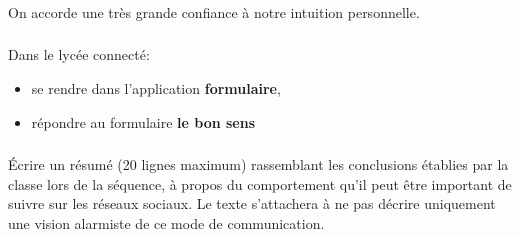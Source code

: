 \documentclass[svgnames,11pt]{beamer}
\begin{document}
\begin{frame}
    \frametitle{}

    \begin{aretenir}[Biais 4]
    \centering On accorde une très grande confiance à notre intuition personnelle.
    \end{aretenir}
\end{frame}
\begin{frame}
    \frametitle{}

    \begin{activite}
    Dans le lycée connecté:
    \begin{itemize}
        \item se rendre dans l'application \textbf{formulaire},
        \item répondre au formulaire \textbf{le bon sens}
    \end{itemize}
    \end{activite}

\end{frame}
\begin{frame}
    \frametitle{}

\begin{activite}
    Écrire un résumé (20 lignes maximum) rassemblant les conclusions établies par la classe lors de la séquence, à propos du comportement qu'il peut être important de suivre sur les réseaux sociaux. Le texte s'attachera à ne pas décrire uniquement une vision alarmiste de ce mode de communication.
    \end{activite}

\end{frame}
\end{document}
